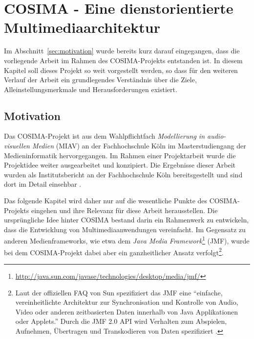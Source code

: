 
\chapter{COSIMA - Eine dienstorientierte Multimediaarchitektur} %
\label{cha:eine_dienstorientierten_multimediaarchitektur}

  Im Abschnitt~\ref{sec:motivation} wurde bereits kurz darauf eingegangen, dass die vorliegende Arbeit im Rahmen des COSIMA-Projekts entstanden ist. In diesem Kapitel soll dieses Projekt so weit vorgestellt werden, so dass für den weiteren Verlauf der Arbeit ein grundlegendes Verständnis über die Ziele, Alleinstellungsmerkmale und Herausforderungen existiert.
  
\section{Motivation} %
\label{sec:motivation_cosima}

  Das COSIMA-Projekt ist aus dem Wahlpflichtfach \emph{Modellierung in audio-visuellen Medien} (MIAV) an der Fachhochschule Köln im Masterstudiengang der Medieninformatik hervorgegangen. Im Rahmen einer Projektarbeit wurde die Projektidee weiter ausgearbeitet und konzipiert. Die Ergebnisse dieser Arbeit wurden als Institutsbericht an der Fachhochschule Köln bereitsgestellt und sind dort im Detail einsehbar \citep{bericht}.
  
  Das folgende Kapitel wird daher nur auf die wesentliche Punkte des COSIMA-Projekts eingehen und ihre Relevanz für diese Arbeit herausstellen. Die ursprüngliche Idee hinter COSIMA bestand darin ein Rahmenwerk zu entwickeln, dass die Entwicklung von Multimediaanwendungen vereinfacht. Im Gegensatz zu anderen Medienframeworks, wie etwa dem \emph{Java Media Framework}\footnote{\url{http://java.sun.com/javase/technologies/desktop/media/jmf/}} (JMF), wurde bei dem COSIMA-Projekt dabei aber ein ganzheitlicher Ansatz verfolgt\footnote{Laut der offiziellen FAQ von Sun spezifiziert das JMF eine "`einfache, vereinheitlichte Architektur zur Synchronisation und Kontrolle von Audio, Video oder anderen zeitbasierten Daten innerhalb von Java Applikationen oder Applets."' Durch die JMF 2.0 API wird Verhalten zum Abspielen, Aufnehmen, Übertragen und Transkodieren von Daten spezifiziert \citep{jmf_faq}.}.
  
